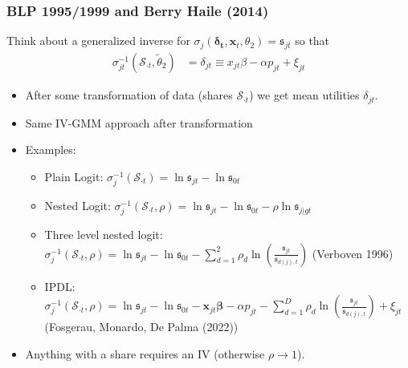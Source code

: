 \begin{frame}
\frametitle{BLP 1995/1999 and Berry Haile (2014)}
Think about a \alert{generalized inverse} for $\sigma_{j}(\boldsymbol{\delta_{t}}, \mathbf{x}_t,\theta_2) = \mathfrak{s}_{jt}$ so that 
\begin{align*}
 \sigma_{jt}^{-1}(\mathcal{S}_{\cdot t},\widetilde{\theta}_2)&= \delta_{jt} \equiv x_{jt} \beta -\alpha p_{jt} +  \xi_{jt} 
\end{align*}
 \begin{itemize}
\item After some transformation of data (shares $\mathcal{S}_{\cdot t}$) we get \alert{mean utilities} $\delta_{jt}$.
\item Same IV-GMM approach after transformation
\item Examples:
\begin{itemize}
\item Plain Logit: $\sigma_{j}^{-1}(\mathcal{S}_{\cdot t}) = \ln \mathfrak{s}_{jt}- \ln \mathfrak{s}_{0t}$
\item Nested Logit: $\sigma_{j}^{-1}(\mathcal{S}_{\cdot t},\rho) = \ln \mathfrak{s}_{jt}- \ln \mathfrak{s}_{0t} - \rho  \ln \mathfrak{s}_{j|gt}$
\item Three level nested logit: $\sigma_{j}^{-1}(\mathcal{S}_{\cdot t},\rho) = \ln \mathfrak{s}_{jt}- \ln \mathfrak{s}_{0t} -\sum_{d=1}^2 \rho_d \ln \left(\frac{\mathfrak{s}_{jt}}{\mathfrak{s}_{d(j), t}}\right)$ (Verboven 1996)
\item IPDL: $\sigma_{j}^{-1}(\mathcal{S}_{\cdot t},\rho) = \ln \mathfrak{s}_{jt}- \ln \mathfrak{s}_{0t}-\mathbf{x}_{j t} \boldsymbol{\beta}-\alpha p_{j t}-\sum_{d=1}^D \rho_d \ln \left(\frac{\mathfrak{s}_{jt}}{\mathfrak{s}_{d(j), t}}\right)+\xi_{j t}$\\ (Fosgerau, Monardo, De Palma (2022))
 \end{itemize}
 \item Anything with a share requires an IV (otherwise $\rho \rightarrow 1$).
 \end{itemize}
\end{frame}



